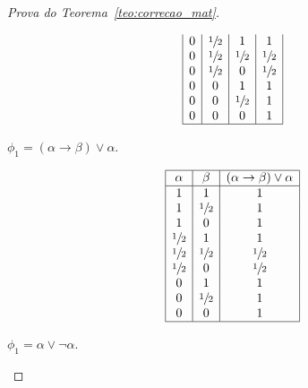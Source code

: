 \begin{proof}[Prova do Teorema~\ref{teo:correcao_mat}]
\begin{provaporcasos}
\begin{provaporsubcasos}
\begin{center}
\[\begin{array}{|c|c|c|c|}
                            0 & \sfrac{1}{2}{} & 1 &1\\
                            0 & \sfrac{1}{2}{} & \sfrac{1}{2}{} &\sfrac{1}{2}{}\\
                            0 & \sfrac{1}{2}{} & 0 &\sfrac{1}{2}{}\\
                            0 & 0 & 1 &1\\
                            0 & 0 & \sfrac{1}{2}{} &1\\
                            0 & 0 & 0 &1\\
                            \hline
                        \end{array}
                    \]
                \end{center}

                
                    
                \subcasodeprova{} $\phi_{1} = (\alpha \to \beta) \lor \alpha$. 

                \begin{center}
                    \[
                        \begin{array}{|c|c|c|}%
                            \hline
                            \alpha      & \beta & (\alpha \to \beta) \lor \alpha \\
                            \hline%
                            1 & 1 & 1\\
                            1 & \meio{} & 1\\
                            1 & 0 & 1\\
                            \meio{} & 1 & 1\\
                            \meio{} & \meio{} & \meio{}\\
                            \meio{} & 0 & \meio{}\\
                            0 & 1 & 1\\
                            0 & \meio{} & 1\\
                            0 & 0 & 1\\
                            \hline
                        \end{array}
                    \]
                \end{center}
                    

                \subcasodeprova{} $\phi_{1} = \alpha \lor \neg \alpha$. 


\end{provaporsubcasos}
\end{provaporcasos}
\end{proof}
